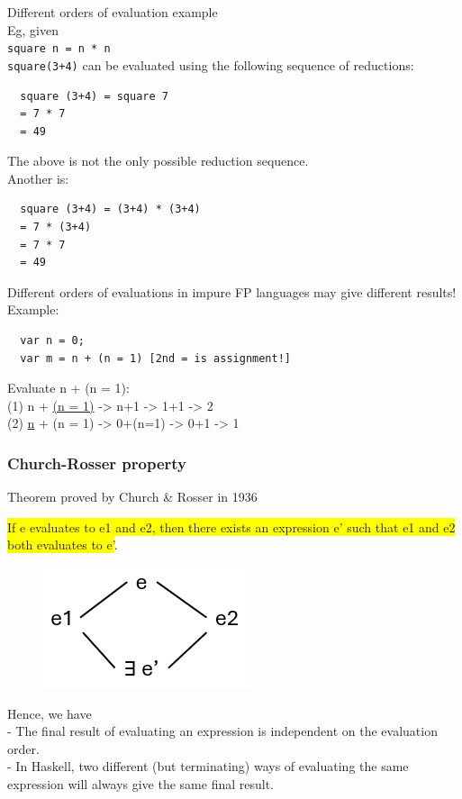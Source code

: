 \documentclass[tikz,border=10pt]{project_plan}
\begin{document}
Different orders of evaluation example\\
Eg, given\\
\lstinline?square n = n * n?\\
\lstinline?square(3+4)? can be evaluated using the following sequence of reductions:
\begin{lstlisting}
  square (3+4) = square 7
  = 7 * 7
  = 49
\end{lstlisting}
The above is not the only possible reduction sequence.\\
Another is:
\begin{lstlisting}
  square (3+4) = (3+4) * (3+4)
  = 7 * (3+4)
  = 7 * 7
  = 49
\end{lstlisting}

Different orders of evaluations in impure FP languages may give different results!\\
Example:\\
\begin{lstlisting}
  var n = 0;
  var m = n + (n = 1) [2nd = is assignment!]
\end{lstlisting}
Evaluate n + (n = 1):\\
(1) n + \underline{(n = 1)} -> n+1 -> 1+1 -> 2\\
(2) \underline{n} + (n = 1) -> 0+(n=1) -> 0+1 -> 1

\subsubsection{Church-Rosser property}

Theorem proved by Church \& Rosser in 1936

\colorbox{yellow}{If e evaluates to e1 and e2, then there exists an expression
  e’ such that e1 and e2 both evaluates to e’}.

\begin{figure}[H]
  \centering
  \includegraphics[width=.3\linewidth]{Church-Rosser property.png}
\end{figure}


Hence, we have\\
- The final result of evaluating an expression is independent
on the evaluation order.\\
- In Haskell, two different (but terminating) ways of
evaluating the same expression will always give the same
final result.
\end{document}
